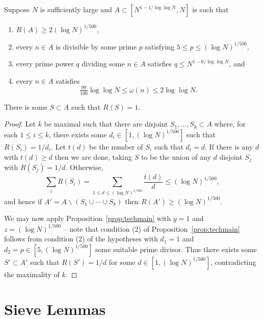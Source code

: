 \begin{corollary}\label{cor:tech_cor}
  \leanok
  Suppose $N$ is sufficiently large and $A\subset [N^{1-1/\log\log N},N]$ is such that
  \begin{enumerate}
  \item $R(A)\geq 2(\log N)^{1/500}$,
  \item every $n\in A$ is divisible by some prime $p$ satisfying $5 \leq p \leq (\log N)^{1/500}$,
  \item every prime power $q$ dividing some $n\in A$ satisfies $q\leq N^{1-6/\log\log N}$, and
  \item every $n\in A$ satisfies
  \[\tfrac{99}{100}\log\log N\leq \omega(n) \leq 2\log\log N.\]
  \end{enumerate}
  There is some $S\subset A$ such that $R(S)=1$.
\end{corollary}
\begin{proof}
  \leanok
  Let $k$ be maximal such that there are disjoint $S_1,\ldots,S_k\subset A$ where, for each $1\leq i\leq k$, there exists some $d_i\in [1,(\log N)^{1/500}]$ such that $R(S_i)=1/d_i$. Let $t(d)$ be the number of $S_i$ such that $d_i=d$. If there is any $d$ with $t(d)\geq d$ then we are done, taking $S$ to be the union of any $d$ disjoint $S_j$ with $R(S_j)=1/d$. Otherwise,
  \[\sum_i R(S_i)= \sum_{1\leq d\leq (\log N)^{1/500}} \frac{t(d)}{d}\leq (\log N)^{1/500},\]
  and hence if $A'=A\backslash (S_1\cup\cdots \cup S_k)$ then $R(A')\geq (\log N)^{1/500}$.

  We may now apply Proposition~\ref{prop:techmain} with $y=1$ and $z=(\log N)^{1/500}$ -- note that condition (2) of Proposition~\ref{prop:techmain} follows from condition (2) of the hypotheses with $d_1=1$ and $d_2=p\in [5,(\log N)^{1/500}]$ some suitable prime divisor. Thus there exists some $S'\subset A'$ such that $R(S')=1/d$ for some $d\in [1,(\log N)^{1/500}]$, contradicting the maximality of $k$.
\end{proof}

\section{Sieve Lemmas}

